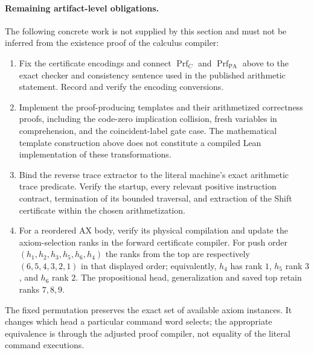 \paragraph{Remaining artifact-level obligations.}
The following concrete work is not supplied by this section and must not
be inferred from the existence proof of the calculus compiler:
\begin{enumerate}
\item Fix the certificate encodings and connect
$\operatorname{Prf}_{C}$ and $\operatorname{Prf}_{\mathrm{PA}}$ above to the
exact checker and consistency sentence used in the published arithmetic
statement.  Record and verify the encoding conversions.
\item Implement the proof-producing templates and their arithmetized
correctness proofs, including the code-zero implication collision, fresh
variables in comprehension, and the coincident-label gate case.  The
mathematical template construction above does not constitute a compiled
Lean implementation of these transformations.
\item Bind the reverse trace extractor to the literal machine's exact
arithmetic trace predicate.  Verify the startup, every relevant positive
instruction contract, termination of its bounded traversal, and extraction
of the Shift certificate within the chosen arithmetization.
\item For a reordered AX body, verify its physical compilation and update
the axiom-selection ranks in the forward certificate compiler.  For push
order $(h_1,h_2,h_3,h_5,h_6,h_4)$ the ranks from the top are respectively
$(6,5,4,3,2,1)$ in that displayed order; equivalently,
$h_4$ has rank $1$, $h_5$ rank $3$, and $h_6$ rank $2$.
The propositional head, generalization and saved top retain ranks $7,8,9$.
\end{enumerate}
The fixed permutation preserves the exact set of available axiom
instances.  It changes which head a particular command word selects;
the appropriate equivalence is through the adjusted proof compiler,
not equality of the literal command executions.
